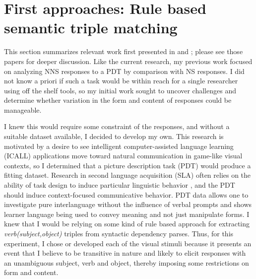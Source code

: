 \section{First approaches: Rule based semantic triple matching}
\label{sec:first-approaches}
This section summarizes relevant work first presented in \citet{king:dickinson:13} and \citet{king:dickinson:14}; please see those papers for deeper discussion. Like the current research, my previous work focused on analyzing NNS responses to a PDT by comparison with NS responses. I did not know a priori if such a task would be within reach for a single researcher using off the shelf tools, so my initial work sought to uncover challenges and determine whether variation in the form and content of responses could be manageable.


%
I knew this would require some constraint of the responses, and without a suitable dataset available, I decided to develop my own. This research is motivated by a desire to see intelligent computer-assisted language learning (ICALL) applications move toward natural communication in game-like visual contexts, so I determined that a picture description task (PDT) would produce a fitting dataset. Research in second language acquisition (SLA) often relies on the
ability of task design to induce particular linguistic behavior
\citep{skehan1998assessing}, and the PDT should induce context-focused
communicative behavior. PDT data allows one to investigate
pure interlanguage without the influence of verbal prompts and shows
learner language being used to convey meaning and not just manipulate forms.
I knew that I would be relying on some kind of rule based approach for extracting \textit{verb(subject,object)} triples from syntactic dependency parses. Thus, for this experiment, I chose or developed each of the visual stimuli because it presents an event that I believe to be transitive in nature and likely to elicit responses with an unambiguous subject, verb and
object, thereby imposing some restrictions on form and content.

